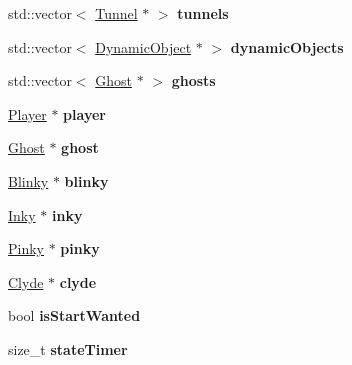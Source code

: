 \begin{DoxyCompactItemize}
\mbox{\label{classGameManager_a379cdc5750510e24f5d33abbccd35636}} 
std\+::vector$<$ \hyperlink{classTunnel}{Tunnel} $\ast$ $>$ {\bfseries tunnels}
\item 
\mbox{\label{classGameManager_aaf80eea84a37e092f0be3ae6b53dec66}} 
std\+::vector$<$ \hyperlink{classDynamicObject}{Dynamic\+Object} $\ast$ $>$ {\bfseries dynamic\+Objects}
\item 
\mbox{\label{classGameManager_af55ae7a2f5c054e6918c283b859de043}} 
std\+::vector$<$ \hyperlink{classGhost}{Ghost} $\ast$ $>$ {\bfseries ghosts}
\item 
\mbox{\label{classGameManager_a22f47dea61789d0a10d9967d9084c5d9}} 
\hyperlink{classPlayer}{Player} $\ast$ {\bfseries player}
\item 
\mbox{\label{classGameManager_a5be78cecbb0c1c0d9b9b114c2dc35d9e}} 
\hyperlink{classGhost}{Ghost} $\ast$ {\bfseries ghost}
\item 
\mbox{\label{classGameManager_a3ff92d6577398553ebd92aeb3ec69c02}} 
\hyperlink{classBlinky}{Blinky} $\ast$ {\bfseries blinky}
\item 
\mbox{\label{classGameManager_a2d0c23c7fd47e66e5b0a4ea475d2d62b}} 
\hyperlink{classInky}{Inky} $\ast$ {\bfseries inky}
\item 
\mbox{\label{classGameManager_a581acffc20707de7d41e804917e7593c}} 
\hyperlink{classPinky}{Pinky} $\ast$ {\bfseries pinky}
\item 
\mbox{\label{classGameManager_a1d764f4acb67f7a5b38046321bf8ce03}} 
\hyperlink{classClyde}{Clyde} $\ast$ {\bfseries clyde}
\item 
\mbox{\label{classGameManager_a193319c20f58c05b219e95b6374faa2a}} 
bool {\bfseries is\+Start\+Wanted}
\item 
\mbox{\label{classGameManager_ae8995792fcb8e8119f1b02230122fb1c}} 
size\+\_\+t {\bfseries state\+Timer}
\item 

\end{DoxyCompactItemize}
